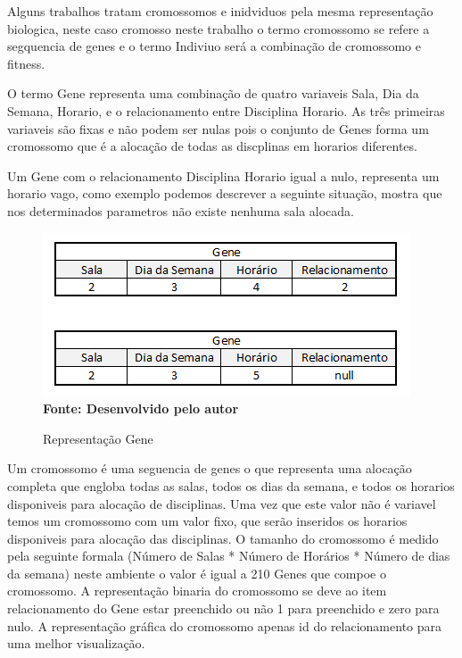 \documentclass{abntpuc}
\begin{document}

Alguns trabalhos tratam cromossomos e inidviduos pela mesma representação biologica, neste caso cromosso neste trabalho o termo cromossomo se refere a segquencia de genes e o termo Indiviuo será a combinação de cromossomo e fitness.\par

O termo Gene representa uma combinação de quatro variaveis Sala, Dia da Semana, Horario, e o relacionamento entre Disciplina Horario. As três primeiras variaveis são fixas e não podem ser nulas pois o conjunto de Genes forma um cromossomo que é a alocação de todas as discplinas em horarios diferentes.\par

Um Gene com o relacionamento Disciplina Horario igual a nulo, representa um horario vago, como exemplo podemos descrever a seguinte situação, mostra que nos determinados parametros não existe nenhuma sala alocada.\par

\begin{figure}[!htb]
\caption[Representação Gene]{Representação Gene}
\label{fig:figura1}
\centering
\includegraphics[scale=0.7]{imagens/representacaoGene.png}
\\ \textbf{\footnotesize Fonte: Desenvolvido pelo autor}
\end{figure}

Um cromossomo é uma seguencia de genes o que representa uma alocação completa que engloba todas as salas, todos os dias da semana, e todos os horarios disponiveis para alocação de disciplinas. Uma vez que este valor não é variavel temos um cromossomo com um valor fixo, que serão inseridos os horarios disponiveis para alocação das disciplinas. O tamanho do cromossomo é medido pela seguinte formala (Número de Salas * Número de Horários * Número de dias da semana) neste ambiente o valor é igual a 210 Genes que compoe o cromossomo. A representação binaria do cromossomo se deve ao item relacionamento do Gene estar preenchido ou não 1 para preenchido e zero para nulo. A representação gráfica do cromossomo apenas id do relacionamento para uma melhor visualização.\par
\end{document}
